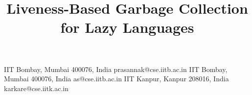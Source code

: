 \documentclass[9pt,preprint,nonatbib]{sigplanconf}
\begin{document}
\setlength{\pdfpageheight}{\paperheight}
\setlength{\pdfpagewidth}{\paperwidth}


\title{Liveness-Based Garbage Collection for Lazy Languages}

%
%
%
%
%
%
       {IIT Bombay, Mumbai 400076, India}
       {prasannak@cse.iitb.ac.in}
       {IIT Bombay, Mumbai 400076, India}
       {as@cse.iitb.ac.in}
       {IIT Kanpur, Kanpur 208016, India}
       {karkare@cse.iitk.ac.in}

\maketitle
\end{document}
